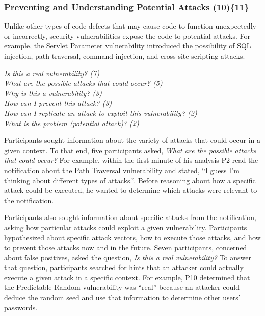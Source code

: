 \documentclass{acm_proc_article-sp}
\begin{document}

\subsubsection{\textbf{Preventing and Understanding Potential Attacks (10)\{11\}}}\label{pupa}
Unlike other types of code defects that may cause code to function unexpectedly or incorrectly, security vulnerabilities expose the code to potential attacks. For example, the Servlet Parameter vulnerability introduced the possibility of SQL injection, path traversal, command injection, and cross-site scripting attacks.


\noindent\emph{Is this a real vulnerability? (7)} \\
\emph{What are the possible attacks that could occur? (5)} \\
\emph{Why is this a vulnerability? (3)} \\
\emph{How can I prevent this attack? (3)} \\
\emph{How can I replicate an attack to exploit this vulnerability? (2)} \\
\emph{What is the problem (potential attack)? (2)} 

 
Participants sought information about the variety of attacks that could occur in a given context.
To that end, five participants asked, \textit{What are the possible attacks that could occur?}
For example, within the first minute of his analysis P2 read the notification about the Path Traversal vulnerability and stated, ``I guess I'm thinking about different types of attacks.''.  
Before reasoning about how a specific attack could be executed, he wanted to determine which attacks were relevant to the notification.

Participants also sought information about specific attacks from the notification, asking how particular attacks could exploit a given vulnerability.
Participants hypothesized about specific attack vectors, how to execute those attacks, and how to prevent those attacks now and in the future.
Seven participants, concerned about false positives, asked the question, \textit{Is this a real vulnerability?} 
To answer that question, participants searched for hints that an attacker could actually execute a given attack in a specific context. 
For example, P10 determined that the Predictable Random vulnerability was ``real'' because an attacker could deduce the random seed and use that information to determine other users' passwords. 
\end{document}
